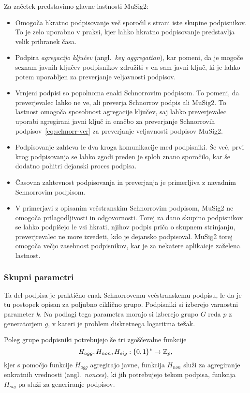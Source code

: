 Za začetek predstavimo glavne lastnosti MuSig2:
\begin{itemize}
    \item Omogoča hkratno podpisovanje več sporočil s strani iste skupine podpisnikov. To je zelo
        uporabno v praksi, kjer lahko hkratno podpisovanje predstavlja velik prihranek časa.
    \item Podpira \textit{agregacijo ključev} (angl.\ \textit{key aggregation}), kar pomeni, da je
        mogoče seznam javnih ključev podpisnikov združiti v en sam javni ključ, ki je lahko potem
        uporabljen za preverjanje veljavnosti podpisov.
    \item Vrnjeni podpisi so popolnoma enaki Schnorrovim podpisom. To pomeni, da preverjevalec lahko
        ne ve, ali preverja Schnorrov podpis ali MuSig2. To lastnost omogoča sposobnost agregacije
        ključev, saj lahko preverjevalec uporabi agregirani javni ključ in enačbo za preverjanje
        Schnorrovih podpisov~\eqref{eq:schnorr-ver} za preverjanje veljavnosti podpisov MuSig2.
    \item Podpisovanje zahteva le dva kroga komunikacije med podpisniki. Še več, prvi krog podpisovanja
        se lahko zgodi preden je sploh znano sporočilo, kar še dodatno pohitri dejanski proces podpisa.
    \item Časovna zahtevnost podpisovanja in preverjanja je primerljiva z navadnim Schnorrovim
        podpisom.
    \item V primerjavi z opisanim večstranskim Schnorrovim podpisom, MuSig2 ne omogoča prilagodljivosti
        in odgovornosti. Torej za dano skupino podpisnikov se lahko podpišejo le vsi hkrati, njihov
        podpis priča o skupnem strinjanju, preverjrevalec ne more izvedeti, kdo je dejansko podpisoval.
        MuSig2 torej omogoča večjo zasebnost podpisnikov, kar je za nekatere aplikaicje zaželena lastnost.
\end{itemize}

\subsubsection{Skupni parametri}
Ta del podpisa je praktično enak Schnorrovemu večstranskemu podpisu, le da je tu postopek opisan za
poljubno ciklično grupo. Podpisniki si izberejo varnostni parameter $k$. Na podlagi tega parametra
morajo si izberejo grupo $G$ reda $p$ z generatorjem $g$, v kateri je problem diskretnega logaritma
težak.

Poleg grupe podpisniki potrebujejo še tri zgoščevalne funkcije
$$
H_{agg}, H_{non}, H_{sig}:\{0, 1\}^* \rightarrow \mathbb Z_p,
$$
kjer s pomočjo funkcije $H_{agg}$ agregirajo javne, funkcija $H_{non}$ služi za agregiranje enkratnih
vrednosti (angl.\ \textit{nonces}), ki jih potrebujejo tekom podpisa, funkcija $H_{sig}$ pa služi
za generiranje podpisov.

